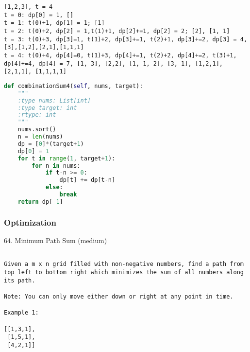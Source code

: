 \documentclass[../main.tex]{subfiles}
\begin{document}
\begin{lstlisting}
[1,2,3], t = 4
t = 0: dp[0] = 1, []
t = 1: t(0)+1, dp[1] = 1; [1]
t = 2: t(0)+2, dp[2] = 1,t(1)+1, dp[2]+=1, dp[2] = 2; [2], [1, 1]
t = 3: t(0)+3, dp[3]=1, t(1)+2, dp[3]+=1, t(2)+1, dp[3]+=2, dp[3] = 4, [3],[1,2],[2,1],[1,1,1]
t = 4: t(0)+4, dp[4]=0, t(1)+3, dp[4]+=1, t(2)+2, dp[4]+=2, t(3)+1, dp[4]+=4, dp[4] = 7, [1, 3], [2,2], [1, 1, 2], [3, 1], [1,2,1],[2,1,1], [1,1,1,1]
\end{lstlisting}
\begin{lstlisting}[language=Python]
def combinationSum4(self, nums, target):
    """
    :type nums: List[int]
    :type target: int
    :rtype: int
    """
    nums.sort()
    n = len(nums)
    dp = [0]*(target+1)
    dp[0] = 1
    for t in range(1, target+1):
        for n in nums:
            if t-n >= 0:
                dp[t] += dp[t-n]
            else:
                break
    return dp[-1]
\end{lstlisting}
\subsubsection{Optimization}
64. Minimum Path Sum (medium)
\begin{lstlisting}

Given a m x n grid filled with non-negative numbers, find a path from top left to bottom right which minimizes the sum of all numbers along its path.

Note: You can only move either down or right at any point in time.

Example 1:

[[1,3,1],
 [1,5,1],
 [4,2,1]]
\end{lstlisting}
\end{document}
